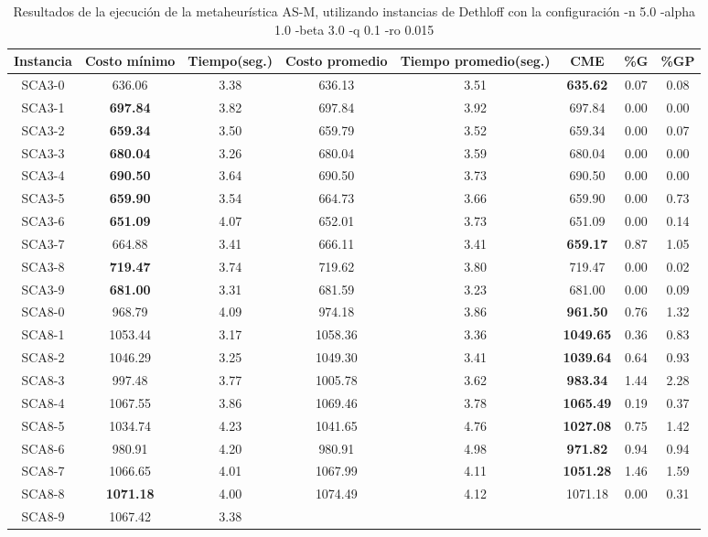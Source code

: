 \begin{table}[h]
\caption{Resultados de la ejecución de la metaheurística AS-M, utilizando instancias de Dethloff con la configuración -n 5.0 -alpha 1.0 -beta 3.0 -q 0.1 -ro 0.015}
\centering
\small
\begin{tabular}{c c c c c c c c}
\hline\hline
Instancia & Costo mínimo & Tiempo(seg.) & Costo promedio & Tiempo promedio(seg.) & CME & \%G & \%GP \\ [0.5ex]
\hline
SCA3-0 & 636.06 & 3.38 & 
636.13 & 3.51 & \bf{635.62} & 
0.07 & 0.08\\SCA3-1 & \bf{697.84} & 3.82 & 
697.84 & 3.92 & 697.84 & 0.00
 & 0.00\\
SCA3-2 & \bf{659.34} & 3.50 & 
659.79 & 3.52 & 659.34 & 0.00
 & 0.07\\SCA3-3 & \bf{680.04} & 3.26 & 
680.04 & 3.59 & 680.04 & 0.00
 & 0.00\\
SCA3-4 & \bf{690.50} & 3.64 & 
690.50 & 3.73 & 690.50 & 0.00
 & 0.00\\
SCA3-5 & \bf{659.90} & 3.54 & 
664.73 & 3.66 & 659.90 & 0.00
 & 0.73\\SCA3-6 & \bf{651.09} & 4.07 & 
652.01 & 3.73 & 651.09 & 0.00
 & 0.14\\SCA3-7 & 664.88 & 3.41 & 
666.11 & 3.41 & \bf{659.17} & 
0.87 & 1.05\\SCA3-8 & \bf{719.47} & 3.74 & 
719.62 & 3.80 & 719.47 & 0.00
 & 0.02\\SCA3-9 & \bf{681.00} & 3.31 & 
681.59 & 3.23 & 681.00 & 0.00
 & 0.09\\SCA8-0 & 968.79 & 4.09 & 
974.18 & 3.86 & \bf{961.50} & 
0.76 & 1.32\\SCA8-1 & 1053.44 & 3.17 & 
1058.36 & 3.36 & \bf{1049.65} & 
0.36 & 0.83\\SCA8-2 & 1046.29 & 3.25 & 
1049.30 & 3.41 & \bf{1039.64} & 
0.64 & 0.93\\SCA8-3 & 997.48 & 3.77 & 
1005.78 & 3.62 & \bf{983.34} & 
1.44 & 2.28\\SCA8-4 & 1067.55 & 3.86 & 
1069.46 & 3.78 & \bf{1065.49} & 
0.19 & 0.37\\SCA8-5 & 1034.74 & 4.23 & 
1041.65 & 4.76 & \bf{1027.08} & 
0.75 & 1.42\\SCA8-6 & 980.91 & 4.20 & 
980.91 & 4.98 & \bf{971.82} & 
0.94 & 0.94\\SCA8-7 & 1066.65 & 4.01 & 
1067.99 & 4.11 & \bf{1051.28} & 
1.46 & 1.59\\SCA8-8 & \bf{1071.18} & 4.00 & 
1074.49 & 4.12 & 1071.18 & 0.00
 & 0.31\\SCA8-9 & 1067.42 & 3.38 & 

\end{tabular}
\end{table}
